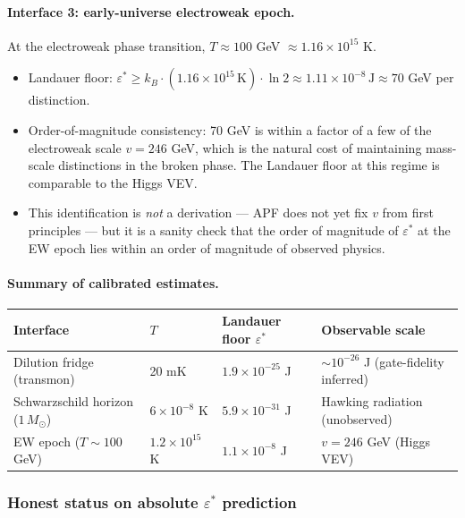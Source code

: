 \documentclass[11pt]{article}
\theoremstyle{plain}
\theoremstyle{definition}
\theoremstyle{remark}
\begin{document}
\paragraph{Interface 3: early-universe electroweak epoch.}  At the electroweak phase transition, $T \approx 100$ GeV $\approx 1.16 \times 10^{15}$ K.
\begin{itemize}[leftmargin=2em,itemsep=2pt]
  \item Landauer floor: $\varepsilon^* \geq k_B \cdot (1.16 \times 10^{15}\,\text{K}) \cdot \ln 2 \approx 1.11 \times 10^{-8}\,\text{J} \approx 70$ GeV per distinction.
  \item Order-of-magnitude consistency: 70 GeV is within a factor of a few of the electroweak scale $v = 246$ GeV, which is the natural cost of maintaining mass-scale distinctions in the broken phase.  The Landauer floor at this regime is comparable to the Higgs VEV.
  \item This identification is \emph{not} a derivation --- APF does not yet fix $v$ from first principles --- but it is a sanity check that the order of magnitude of $\varepsilon^*$ at the EW epoch lies within an order of magnitude of observed physics.
\end{itemize}

\paragraph{Summary of calibrated estimates.}
\begin{center}
\small
\begin{tabular}{@{}l l l l@{}}
\toprule
\textbf{Interface} & \textbf{$T$} & \textbf{Landauer floor $\varepsilon^*$} & \textbf{Observable scale} \\
\midrule
Dilution fridge (transmon) & 20 mK & $1.9 \times 10^{-25}$ J & $\sim 10^{-26}$ J (gate-fidelity inferred) \\
Schwarzschild horizon ($1\,M_\odot$) & $6 \times 10^{-8}$ K & $5.9 \times 10^{-31}$ J & Hawking radiation (unobserved) \\
EW epoch ($T \sim 100$ GeV) & $1.2 \times 10^{15}$ K & $1.1 \times 10^{-8}$ J & $v = 246$ GeV (Higgs VEV) \\
\bottomrule
\end{tabular}
\end{center}

\subsubsection{Honest status on absolute $\varepsilon^*$ prediction}\label{supp:A4_status}
\end{document}
